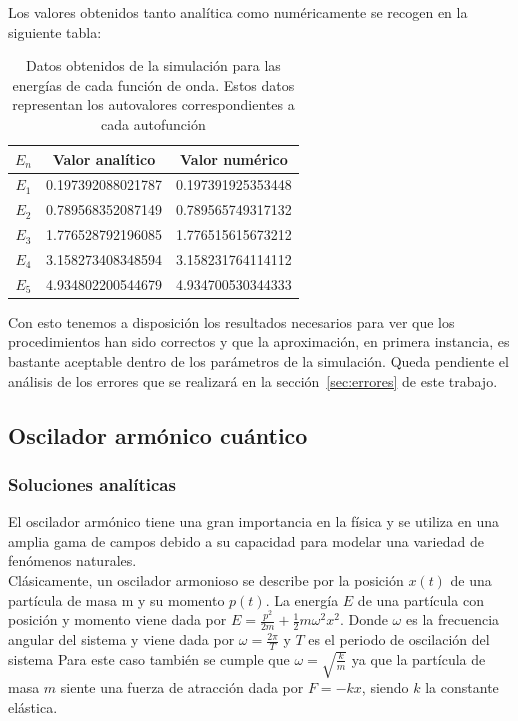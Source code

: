 \documentclass[12pt]{article}
\begin{document}
Los valores obtenidos tanto analítica como numéricamente se recogen en la siguiente tabla:


\begin{table}[H]
    \centering
    \begin{tabular}{|c||c||c|}
    \hline
        $E_n$ & Valor analítico & Valor numérico \\ \hline \hline
        $E_1$ & 0.197392088021787 & 0.197391925353448 \\ \hline
        $E_2$ & 0.789568352087149 & 0.789565749317132 \\ \hline
        $E_3$ & 1.776528792196085 & 1.776515615673212 \\ \hline
        $E_4$ & 3.158273408348594 & 3.158231764114112 \\ \hline
        $E_5$ & 4.934802200544679 & 4.934700530344333 \\ \hline
    \end{tabular}
    \caption{Datos obtenidos de la simulación para las energías de cada función de onda. Estos datos representan los autovalores correspondientes a cada autofunción}
\end{table}

Con esto tenemos a disposición los resultados necesarios para ver que los procedimientos han sido correctos y que la aproximación, en primera instancia, es bastante aceptable dentro de los parámetros de la simulación. Queda pendiente el análisis de los errores que se realizará en la sección~\ref{sec:errores} de este trabajo.

        \subsection{Oscilador armónico cuántico}

    \subsubsection{Soluciones analíticas}

    El oscilador armónico tiene una gran importancia en la física 
    y se utiliza en una amplia gama de campos debido a su capacidad para modelar una variedad de fenómenos naturales.\\
    
    Clásicamente, un oscilador armonioso se describe por la posición $x(t)$ de una partícula de masa m y su momento $p(t)$. 
    La energía $E$ de una partícula con posición y momento viene dada por $E = \frac{p^2}{2m} + \frac{1}{2}m\omega^2x^2$.
    Donde $\omega$ es la frecuencia angular del sistema y viene dada por $\omega=\frac{2\pi}{T}$ y $T$ es el periodo de oscilación del sistema
    Para este caso también se cumple que $\omega=\sqrt{\frac{k}{m}}$ ya que la partícula de masa $m$ siente una fuerza de atracción dada por $F=-kx$, siendo $k$ la constante elástica.\\
    
\end{document}
